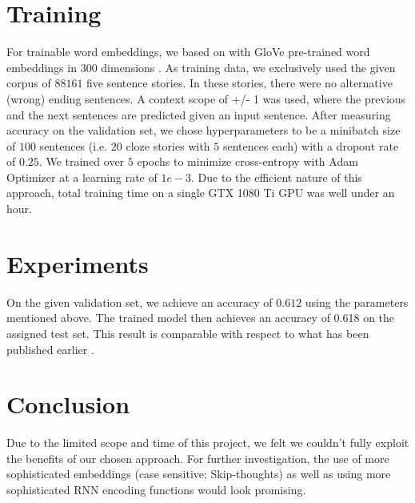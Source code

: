 \documentclass{article}
\begin{document}
\section{Training}
For trainable word embeddings, we based on with GloVe pre-trained word embeddings in $300$ dimensions \cite{pennington2014glove}. 
As training data, we exclusively used the given corpus of $88161$ five sentence stories. In these stories, there were no alternative (wrong) ending sentences. 
A context scope of +/- 1  was used, where the previous and the next sentences are predicted given an input sentence.
After measuring accuracy on the validation set, we chose hyperparameters to be a minibatch size of $100$ sentences (i.e. $20$ cloze stories with $5$ sentences each) with a dropout rate of $0.25$. We trained over $5$ epochs to minimize cross-entropy with Adam Optimizer at a learning rate of $1e-3$.
Due to the efficient nature of this approach, total training time on a single GTX 1080 Ti GPU was well under an hour.


\section{Experiments}
On the given validation set, we achieve an accuracy of $0.612$ using the parameters mentioned above. The trained model then achieves an accuracy of 0.618 on the assigned test set. This result is comparable with respect to what has been published earlier \cite{mostafazadeh-EtAl:2016:N16-1, Roemmele2017AnRB}.

\section{Conclusion}
Due to the limited scope and time of this project, we felt we couldn't fully exploit the benefits of our chosen approach. For further investigation, the use of more sophisticated embeddings (case sensitive; Skip-thoughts) as well as using more sophisticated RNN encoding functions would look promising.

%
 
\end{document}
